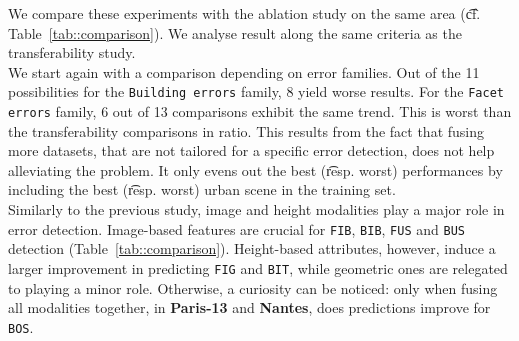         \begin{figure}[htbp]
        \end{figure}
            
        We compare these experiments with the ablation study on the same area (\t{cf.} Table~\ref{tab::comparison}).
        We analyse result along the same criteria as the transferability study.\\
    
        We start again with a comparison depending on error families.
        Out of the 11 possibilities for the \texttt{Building errors} family, 8 yield worse results.
        For the \texttt{Facet errors} family, 6 out of 13 comparisons exhibit the same trend.
        This is worst than the transferability comparisons in ratio.
        This results from the fact that fusing more datasets, that are not tailored for a specific error detection, does not help alleviating the problem.
        It only evens out the best (\t{resp.} worst) performances by including the best (\t{resp.} worst) urban scene in the training set.\\
        
        Similarly to the previous study, image and height modalities play a major role in error detection.
        Image-based features are crucial for \texttt{FIB}, \texttt{BIB}, \texttt{FUS} and \texttt{BUS} detection (Table~\ref{tab::comparison}).
        Height-based attributes, however, induce a larger improvement in predicting \texttt{FIG} and \texttt{BIT}, while geometric ones are relegated to playing a minor role.
        Otherwise, a curiosity can be noticed: only when fusing all modalities together, in \textbf{Paris-13} and \textbf{Nantes}, does predictions improve for \texttt{BOS}.\\
        
